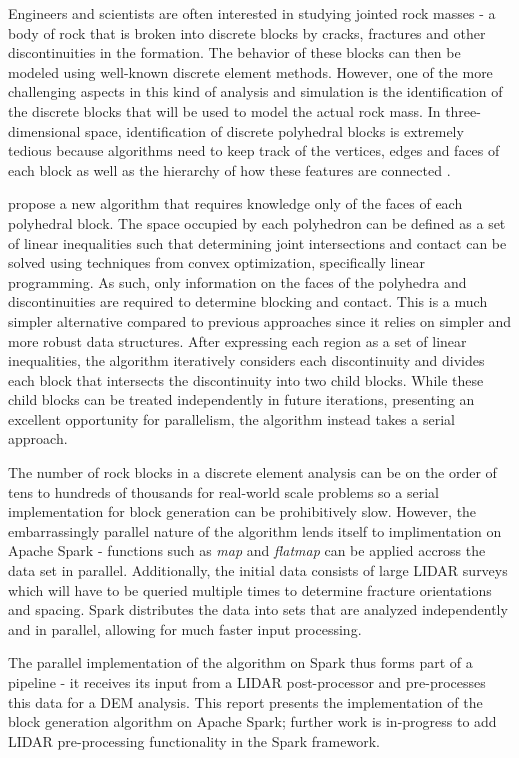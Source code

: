 Engineers and scientists are often interested in studying jointed rock masses - a body of rock that is broken into discrete blocks by cracks, fractures and other discontinuities in the formation. The behavior of these blocks can then be modeled using well-known discrete element methods. However, one of the more challenging aspects in this kind of analysis and simulation is the identification of the discrete blocks that will be used to model the actual rock mass. In three-dimensional space, identification of discrete polyhedral blocks is extremely tedious because algorithms need to keep track of the vertices, edges and faces of each block as well as the hierarchy of how these features are connected \cite{slicing}. \par

\cite{slicing} propose a new algorithm that requires knowledge only of the faces of each polyhedral block. The space occupied by each polyhedron can be defined as a set of linear inequalities such that determining joint intersections and contact can be solved using techniques from convex optimization, specifically linear programming. As such, only information on the faces of the polyhedra and discontinuities are required to determine blocking and contact. This is a much simpler alternative compared to previous approaches since it relies on simpler and more robust data structures. After expressing each region as a set of linear inequalities, the algorithm iteratively considers each discontinuity and divides each block that intersects the discontinuity into two child blocks. While these child blocks can be treated independently in future iterations, presenting an excellent opportunity for parallelism, the algorithm instead takes a serial approach. \par

The number of rock blocks in a discrete element analysis can be on the order of tens to hundreds of thousands for real-world scale problems so a serial implementation for block generation can be prohibitively slow. However, the embarrassingly parallel nature of the algorithm lends itself to implimentation on Apache Spark - functions such as \textit{map} and \textit{flatmap} can be applied accross the data set in parallel. Additionally, the initial data consists of large LIDAR surveys which will have to be queried multiple times to determine fracture orientations and spacing. Spark distributes the data into sets that are analyzed independently and in parallel, allowing for much faster input processing. \par

The parallel implementation of the \cite{slicing} algorithm on Spark thus forms part of a pipeline - it receives its input from a LIDAR post-processor and pre-processes this data for a DEM analysis. This report presents the implementation of the block generation algorithm on Apache Spark; further work is in-progress to add LIDAR pre-processing functionality in the Spark framework.

